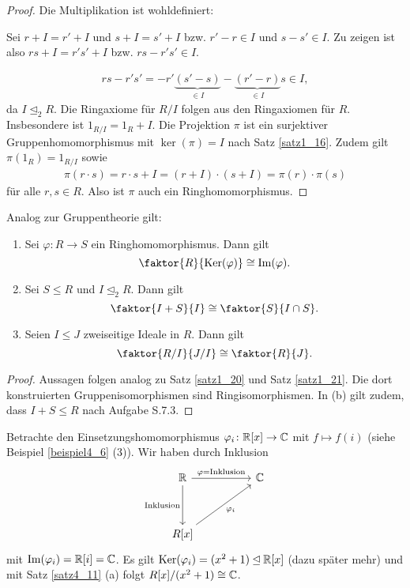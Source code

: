 \begin{proof}
	Die Multiplikation ist wohldefiniert:
	
	Sei $r + I = r' + I$ und $s+I = s'+I$ bzw. $r' - r \in I$ und $s - s' \in I$. Zu zeigen ist also $rs + I = r's' + I$ bzw. $rs - r's' \in I$.
	
	\begin{align*}
		rs - r's' = -r'\underbrace{(s' - s)}_{\in I} - \underbrace{(r' - r)}_{\in I} s \in I,
	\end{align*}
	da $I \unlhd_2 R$. Die Ringaxiome für $R/I$ folgen aus den Ringaxiomen für $R$. Insbesondere ist $1_{R/I} = 1_R + I$. Die Projektion $\pi$ ist ein surjektiver Gruppenhomomorphismus mit  $\ker(\pi) = I$ nach Satz \ref{satz1_16}. Zudem gilt $\pi(1_R) = 1_{R/I}$ sowie
	\begin{align*}
		\pi(r\cdot s) = r \cdot s + I = (r+I)\cdot(s + I) = \pi(r) \cdot \pi(s)
	\end{align*}
	für alle $r,s \in R$. Also ist $\pi$ auch ein Ringhomomorphismus.
\end{proof}
Analog zur Gruppentheorie gilt:
\begin{satz}\label{satz4_11}
	\begin{enumerate}[label=(\alph*)]
		\item Sei $\varphi \colon R \to S$ ein Ringhomomorphismus. Dann gilt
		\[\faktor{R}{\ker(\varphi)} \cong \im(\varphi).\]
		\item Sei $S \leq R$ und $I \unlhd_2 R$. Dann gilt
		\[\faktor{I+S}{I} \cong \faktor{S}{I \cap S}.\]
		\item Seien $I \leq J$ zweiseitige Ideale in $R$. Dann gilt
		\[\faktor{R/I}{J/I} \cong \faktor{R}{J}.\]
	\end{enumerate}
\end{satz}
\begin{proof}
	Aussagen folgen analog zu Satz \ref{satz1_20} und Satz \ref{satz1_21}. Die dort konstruierten Gruppenisomorphismen sind Ringisomorphismen. In (b) gilt zudem, dass $I+S \leq R$ nach Aufgabe S.7.3.
\end{proof}
\begin{beispiel}\label{beispiel4_12}
	Betrachte den Einsetzungshomomorphismus $\varphi_i \colon \mathbb{R}[x] \to \mathbb{C}$ mit $f \mapsto f(i)$ (siehe Beispiel \ref{beispiel4_6} (3)). Wir haben durch Inklusion
	\[
	\begin{tikzcd}[row sep=huge, column sep=huge]
		\R \arrow{r}{\varphi = \text{Inklusion}} \arrow[swap]{d}{\text{Inklusion}} & \C\\
		R[x] \arrow[swap]{ur}{\varphi_i} 
	\end{tikzcd}
	\]
	mit $\mathrm{Im}(\varphi_i) = \mathbb{R}[i] = \mathbb{C}$. Es gilt $\mathrm{Ker}(\varphi_i) = (x^2 + 1) \unlhd \mathbb{R}[x]$ (dazu später mehr) und mit Satz \ref{satz4_11} (a) folgt $R[x] /(x^2 + 1) \cong \mathbb{C}$.
\end{beispiel}
